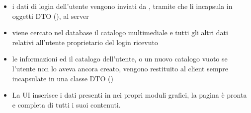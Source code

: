 \begin{itemize}
  \item i dati di login dell'utente vengono inviati da ,
  tramite  che li incapsula in oggetti DTO (),
  al server
  \item viene cercato nel database il catalogo multimediale e tutti
  gli altri dati relativi all'utente proprietario del login ricevuto
  \item le informazioni ed il catalogo dell'utente, o un nuovo catalogo vuoto se
  l'utente non lo aveva ancora creato, vengono restituito al client sempre
  incapsulate in una classe DTO ()
  \item La UI  inserisce i dati presenti in 
  nei propri moduli grafici, la pagina \`e pronta e completa di tutti i suoi
  contenuti.
\end{itemize}

